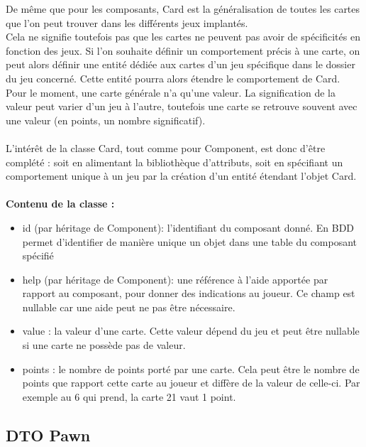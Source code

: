 \documentclass{article}
\begin{document}
                De même que pour les composants, Card est la généralisation de toutes les cartes que l'on peut trouver dans les différents jeux implantés.\\
                \indent Cela ne signifie toutefois pas que les cartes ne peuvent pas avoir de spécificités en fonction des jeux. Si l'on souhaite définir un comportement précis à une carte, on peut alors définir une entité dédiée aux cartes d'un jeu spécifique dans le dossier du jeu concerné. Cette entité pourra alors étendre le comportement de Card.\\
                \indent Pour le moment, une carte générale n'a qu'une valeur. La signification de la valeur peut varier d'un jeu à l'autre, toutefois une carte se retrouve souvent avec une valeur (en points, un nombre significatif).\\
                \\
                \indent L'intérêt de la classe Card, tout comme pour Component, est donc d'être complété : soit en alimentant la bibliothèque d'attributs, soit en spécifiant un comportement unique à un jeu par la création d'un entité étendant l'objet Card.\\
                \\
                \textbf{Contenu de la classe :}
                \begin{itemize}
                    \item id (par héritage de Component): l'identifiant du composant donné. En BDD permet d'identifier de manière unique un objet dans une table du composant spécifié
                    \item help (par héritage de Component): une référence à l'aide apportée par rapport au composant, pour donner des indications au joueur. Ce champ est nullable car une aide peut ne pas être nécessaire.
                    \item value : la valeur d'une carte. Cette valeur dépend du jeu et peut être nullable si une carte ne possède pas de valeur.
                    \item points : le nombre de points porté par une carte. Cela peut être le nombre de points que rapport cette carte au joueur et diffère de la valeur de celle-ci. Par exemple au 6 qui prend, la carte 21 vaut 1 point.
                \end{itemize}

            \newpage
            \subsection{DTO Pawn}
\end{document}
